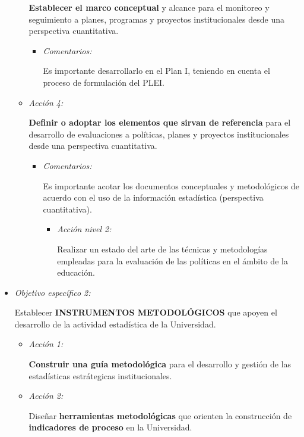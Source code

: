 \documentclass[
]{book}
\begin{document}
\begin{itemize}
\begin{itemize}
    \textbf{Establecer el marco conceptual} y alcance para el monitoreo y seguimiento a planes, programas y proyectos institucionales desde una perspectiva cuantitativa.

    \begin{itemize}
    \item
      \emph{Comentarios:}

      Es importante desarrollarlo en el Plan I, teniendo en cuenta el proceso de formulación del PLEI.
    \end{itemize}
  \item
    \emph{Acción 4:}

    \textbf{Definir o adoptar los elementos que sirvan de referencia} para el desarrollo de evaluaciones a políticas, planes y proyectos institucionales desde una perspectiva cuantitativa.

    \begin{itemize}
    \item
      \emph{Comentarios:}

      Es importante acotar los documentos conceptuales y metodológicos de acuerdo con el uso de la información estadística (perspectiva cuantitativa).

      \begin{itemize}
      \item
        \emph{Acción nivel 2:}

        Realizar un estado del arte de las técnicas y metodologías empleadas para la evaluación de las políticas en el ámbito de la educación.
      \end{itemize}
    \end{itemize}
  \end{itemize}
\item
  \emph{Objetivo específico 2:}

  Establecer \textbf{INSTRUMENTOS METODOLÓGICOS} que apoyen
  el desarrollo de la actividad estadística de la
  Universidad.

  \begin{itemize}
  \item
    \emph{Acción 1:}

    \textbf{Construir una guía metodológica} para el desarrollo y gestión de las estadísticas estrátegicas institucionales.
  \item
    \emph{Acción 2:}

    Diseñar \textbf{herramientas metodológicas} que orienten la construcción de \textbf{indicadores de proceso} en la Universidad.


\end{itemize}
\end{itemize}
\end{document}
